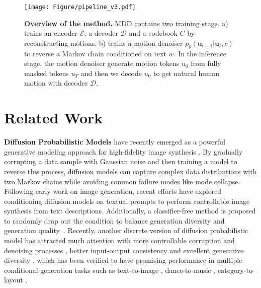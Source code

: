 \documentclass[letterpaper]{article} \usepackage{aaai24}
\begin{document}
\begin{figure*}[t] 
	\centering 
	\texttt{[image: Figure/pipeline\_v3.pdf]} 
	\caption{\textbf{Overview of the method.} MDD contains two training stage. a) trains an encoder $\mathcal{E}$, a decoder $\mathcal{D}$ and a codebook $C$ by reconstructing motions. b) trains a motion denoiser $p_\theta(\bm{u}_{t-1}|\bm{u}_t, c)$ to reverse a Markov chain conditioned on text $w$. In the inference stage, the motion denoiser generate motion tokens $u_0$ from fully masked tokens $u_T$ and then we decode $u_0$ to get natural human motion with decoder $\mathcal{D}$.}
	\label{framework} 
\end{figure*}

\section{Related Work}

\noindent\textbf{Diffusion Probabilistic Models} \cite{sohldickstein2015deep,song2021scorebased} have recently emerged as a powerful generative modeling approach for high-fidelity image synthesis \cite{ho2020denoising,ho2021cascaded,dhariwal2021diffusion}. 
By gradually corrupting a data sample with Gaussian noise and then training a model to reverse this process, diffusion models can capture complex data distributions with two Markov chains while avoiding common failure modes like mode collapse. 
Following early work on image generation, recent efforts \cite{austin2023structured,dhariwal2021diffusion} have explored conditioning diffusion models on textual prompts to perform controllable image synthesis from text descriptions. Additionally, a classifier-free \cite{ho2022classifierfree} method is proposed to randomly drop out the condition to balance generation diversity and generation quality~\cite{nichol2022glide}.
Recently, another discrete version of diffusion probabilistic model \cite{austin2023structured,sohldickstein2015deep,hoogeboom2021argmax} has attracted much attention with more controllable corruption and denoising processes \cite{austin2023structured}, better input-output consistency \cite{zhu2023discrete} and excellent generative diversity \cite{gu2022vector}, which has been verified to have promising performance in multiple conditional generation tasks such as text-to-image \cite{gu2022vector}, dance-to-music \cite{zhu2023discrete}, category-to-layout \cite{inoue2023layoutdm}.
\end{document}
